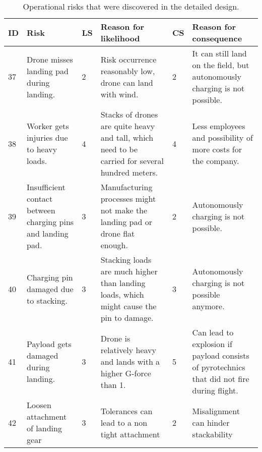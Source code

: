 \begin{table}[h]
\centering
\caption{Operational risks that were discovered in the detailed design.}
\label{tab:newrisksoperations}
\begin{scriptsize}
\begin{tabular}{|p{0.4cm}|p{3cm}|p{0.4cm}|p{4.5cm}|p{0.4cm}|p{4.5cm}|}
\hline
\multicolumn{1}{|l|}{\textbf{ID}} & \textbf{Risk}                                               & \multicolumn{1}{l|}{\textbf{LS}} & \textbf{Reason for likelihood}                                                                  & \multicolumn{1}{l|}{\textbf{CS}} & \textbf{Reason for consequence}                                                            \\ \hline
37                                & Drone misses landing pad during landing.                    & 2                                & Risk occurrence reasonably low, drone can land with wind.                                        & 2                                & It can still land on the field, but autonomously charging is not possible.                 \\ \hline
38                                & Worker gets injuries due to heavy loads.                    & 4                                & Stacks of drones are quite heavy and tall, which need to be carried for several hundred meters. & 4                                & Less employees and possibility of more costs for the company.                             \\ \hline
39                                & Insufficient contact between charging pins and landing pad. & 3                                & Manufacturing processes might not make the landing pad or drone flat enough.                    & 2                                & Autonomously charging is not possible.                                                     \\ \hline
40                                & Charging pin damaged due to stacking.                       & 3                                & Stacking loads are much higher than landing loads, which might cause the pin to damage.         & 3                                & Autonomously charging is not possible anymore.                                             \\ \hline
41                                & Payload gets damaged during landing.                        & 3                                & Drone is relatively heavy and lands with a higher G-force than 1.                               & 5                                & Can lead to explosion if payload consists of pyrotechnics that did not fire during flight. \\ \hline
42 & Loosen attachment of landing gear & 3 & Tolerances can lead to a non tight attachment & 2 & Misalignment can hinder stackability  \\ \hline
\end{tabular}
\end{scriptsize}
\end{table}

